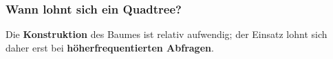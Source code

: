 \subsubsection{Wann lohnt sich ein Quadtree?}
\begin{statementbox}
Die \textbf{Konstruktion} des Baumes ist relativ aufwendig; der Einsatz lohnt sich daher erst bei \textbf{höherfrequentierten Abfragen}.
\end{statementbox}






